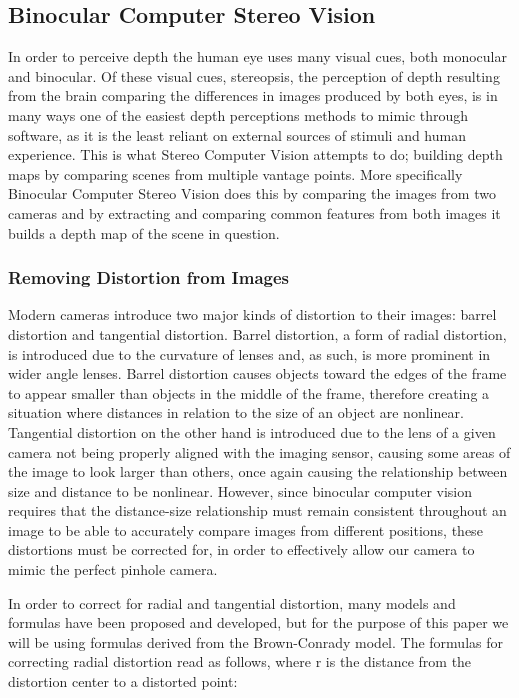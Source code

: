 \subsection{Binocular Computer Stereo Vision}
In order to perceive depth the human eye uses many visual cues, both monocular and binocular. Of these visual cues, stereopsis, the perception of depth resulting from the brain comparing the differences in images produced by both eyes, is in many ways one of the easiest depth perceptions methods to mimic through software, as it is the least reliant on external sources of stimuli and human experience. This is what Stereo Computer Vision attempts to do; building depth maps by comparing scenes from multiple vantage points. More specifically Binocular Computer Stereo Vision does this by comparing the images from two cameras and by extracting and comparing common features from both images it builds a depth map of the scene in question.

\subsubsection{Removing Distortion from Images}
Modern cameras introduce two major kinds of distortion to their images: barrel distortion and tangential distortion. Barrel distortion, a form of radial distortion, is introduced due to the curvature of lenses and, as such, is more prominent in wider angle lenses. Barrel distortion causes objects toward the edges of the frame to appear smaller than objects in the middle of the frame, therefore creating a situation where distances in relation to the size of an object are nonlinear. Tangential distortion on the other hand is introduced due to the lens of a given camera not being properly aligned with the imaging sensor, causing some areas of the image to look larger than others, once again causing the relationship between size and distance to be nonlinear. However, since binocular computer vision requires that the distance-size relationship must remain consistent throughout an image to be able to accurately compare images from different positions, these distortions must be corrected for, in order to effectively allow our camera to mimic the perfect pinhole camera.

In order to correct for radial and tangential distortion, many models and formulas have been proposed and developed, but for the purpose of this paper we will be using formulas derived from the Brown-Conrady model. The formulas for correcting radial distortion read as follows, where r is the distance from the distortion center to a distorted point:

